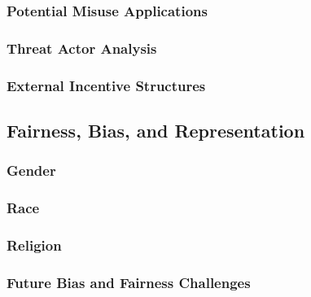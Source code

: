 \documentclass{article}
\begin{document}
        \subsubsection{Potential Misuse Applications}
        \label{section:Potential_Misuse_Applications}
        
    
        \subsubsection{Threat Actor Analysis}
        \label{section:Threat_Actor_Analysis}
        
    
    
        \subsubsection{External Incentive Structures}
        \label{section:External_Incentive_Structures}
        

    \subsection{Fairness, Bias, and Representation}
    \label{section:Fairness_Bias_and_Representation}
    
    
        \subsubsection{Gender}
        \label{section:Gender}
        
        
        \subsubsection{Race}
        \label{section:Race}
        
        
        \subsubsection{Religion}
        \label{section:Religion}
        
        
        \subsubsection{Future Bias and Fairness Challenges}
        \label{section:Future_Bias_and_Fairness_Challenges}
        
\end{document}
